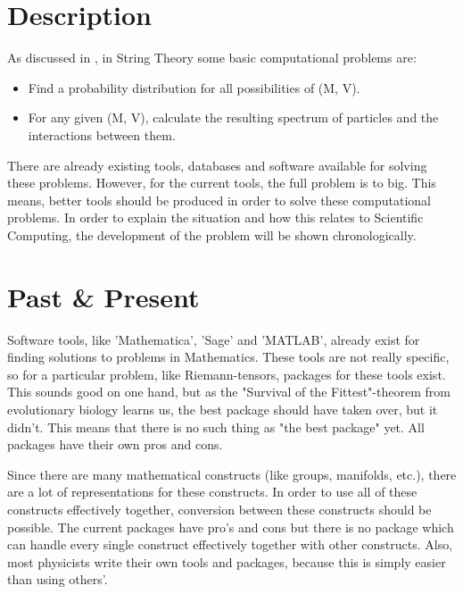 \documentclass[../paper.tex]{subfiles}
\begin{document}
\section*{Description}
As discussed in \citep{ComputationalExploration}, in String Theory some basic computational problems are:
\begin{itemize}
    \item Find a probability distribution for all possibilities of (M, V).
    \item For any given (M, V), calculate the resulting spectrum of particles and the interactions between them.
\end{itemize}


There are already existing tools, databases and software available for solving these problems. However, for the current tools, the full problem is to big. This means, better tools should be produced in order to solve these computational problems. In order to explain the situation and how this relates to Scientific Computing, the development of the problem will be shown chronologically.

\section*{Past \& Present}
Software tools, like 'Mathematica', 'Sage' and 'MATLAB', already exist for finding solutions to problems in Mathematics. These tools are not really specific, so for a particular problem, like Riemann-tensors, packages for these tools exist. This sounds good on one hand, but as the "Survival of the Fittest"-theorem from evolutionary biology learns us, the best package should have taken over, but it didn't. This means that there is no such thing as "the best package" yet. All packages have their own pros and cons.

Since there are many mathematical constructs (like groups, manifolds, etc.), there are a lot of representations for these constructs. In order to use all of these constructs effectively together, conversion between these constructs should be possible. The current packages have pro's and cons but there is no package which can handle every single construct effectively together with other constructs. Also, most physicists write their own tools and packages, because this is simply easier than using others'. 
\end{document}
